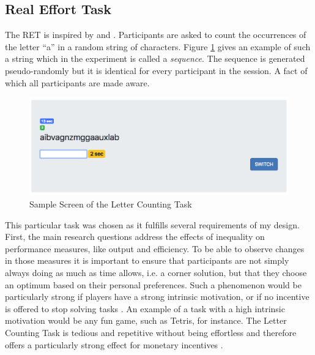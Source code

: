     
    \subsection{Real Effort Task}
    \label{sec:RET}
    
    The RET is inspired by \cite{rey-biel2016} and \cite{giusti2014}. Participants are asked to count the occurrences of the letter ``a'' in a random string of characters. Figure \ref{fig:LC_screen} gives an example of such a string which in the experiment is called a \textit{sequence}. The sequence is generated pseudo-randomly but it is identical for every participant in the session. A fact of which all participants are made aware.\\ 
    
    \begin{figure}[h]
        \centering
        \includegraphics[width=\textwidth]{graphs/screenshot_RET_alone.png}
        \caption{Sample Screen of the Letter Counting Task}
        \label{fig:LC_screen}
    \end{figure}
    
    This particular task was chosen as it fulfills several requirements of my design. First, the main research questions address the effects of inequality on performance measures, like output and efficiency. To be able to observe changes in those measures it is important to ensure that participants are not simply always doing as much as time allows, i.e. a corner solution, but that they choose an optimum based on their personal preferences. Such a phenomenon would be particularly strong if players have a strong intrinsic motivation, or if no incentive is offered to stop solving tasks \citep{frey1997}. An example of a task with a high intrinsic motivation would be any fun game, such as Tetris, for instance.
    The Letter Counting Task is tedious and repetitive without being effortless and therefore offers a particularly strong effect for monetary incentives \citep{cerasoli2014}.\\
    
